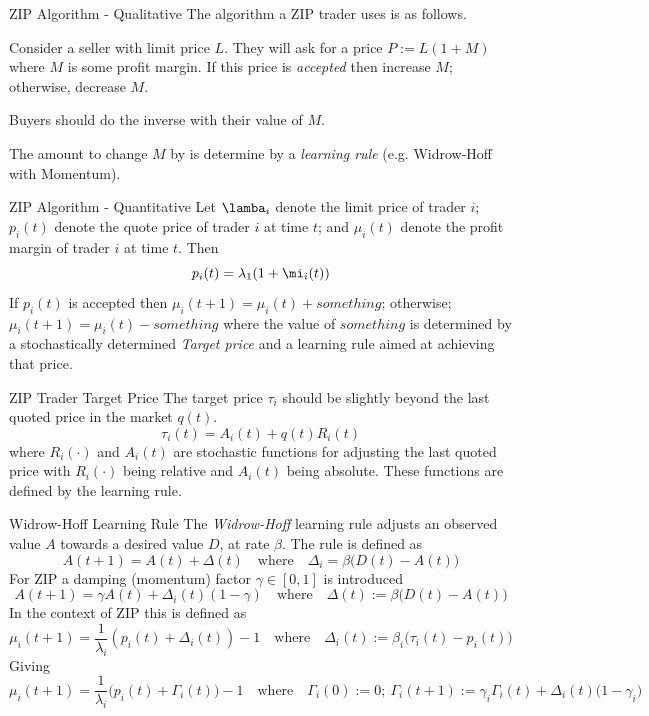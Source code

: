 \documentclass[11pt,a4paper]{article}
\begin{document}
  \begin{proposition}{ZIP Algorithm - Qualitative}
    The algorithm a ZIP trader uses is as follows.
    \par Consider a seller with limit price $L$. They will ask for a price $P:=L(1+M)$ where $M$ is some profit margin. If this price is \textit{accepted} then increase $M$; otherwise, decrease $M$.
    \par Buyers should do the inverse with their value of $M$.
    \par The amount to change $M$ by is determine by a \textit{learning rule} (e.g. Widrow-Hoff with Momentum).
  \end{proposition}

  \begin{proposition}{ZIP Algorithm - Quantitative}
    Let $\lamba_i$ denote the limit price of trader $i$; $p_i(t)$ denote the quote price of trader $i$ at time $t$; and $\mu_i(t)$ denote the profit margin of trader $i$ at time $t$. Then
    \[ p_i(t)=\lambda_1(1+\mi_i(t)) \]
    If $p_i(t)$ is accepted then $\mu_i(t+1)=\mu_i(t)+something$; otherwise; $\mu_i(t+1)=\mu_i(t)-something$ where the value of $something$ is determined by a stochastically determined \textit{Target price} and a learning rule aimed at achieving that price.
  \end{proposition}

  \begin{proposition}{ZIP Trader Target Price}
    The target price $\tau_i$ should be slightly beyond the last quoted price in the market $q(t)$.
    \[ \tau_i(t)=A_i(t)+q(t)R_i(t) \]
    where $R_i(\cdot)$ and $A_i(t)$ are stochastic functions for adjusting the last quoted price with $R_i(\cdot)$ being relative and $A_i(t)$ being absolute. These functions are defined by the learning rule.
  \end{proposition}

  \begin{definition}{Widrow-Hoff Learning Rule}
    The \textit{Widrow-Hoff} learning rule adjusts an observed value $A$ towards a desired value $D$, at rate $\beta$. The rule is defined as
    \[ A(t+1)=A(t)+\Delta(t)\quad\text{where}\quad\Delta_i=\beta\big(D(t)-A(t)\big) \]
    For ZIP a damping (momentum) factor $\gamma\in[0,1]$ is introduced
    \[ A(t+1)=\gamma A(t)+\Delta_i(t)(1-\gamma)\quad\text{where}\quad\Delta(t):=\beta\big(D(t)-A(t)\big) \]
    In the context of ZIP this is defined as
    \[ \mu_i(t+1)=\frac1{\lambda_i}(p_i(t)+\Delta_i(t))-1\quad\text{where}\quad\Delta_i(t):=\beta_i\big(\tau_i(t)-p_i(t)\big) \]
    Giving
    \[ \mu_i(t+1)=\frac1{\lambda_i}\big(p_i(t)+\Gamma_i(t)\big)-1\quad\text{where}\quad\Gamma_i(0):=0;\ \Gamma_i(t+1):=\gamma_i\Gamma_i(t)+\Delta_i(t)\big(1-\gamma_i\big) \]
  \end{definition}
\end{document}
